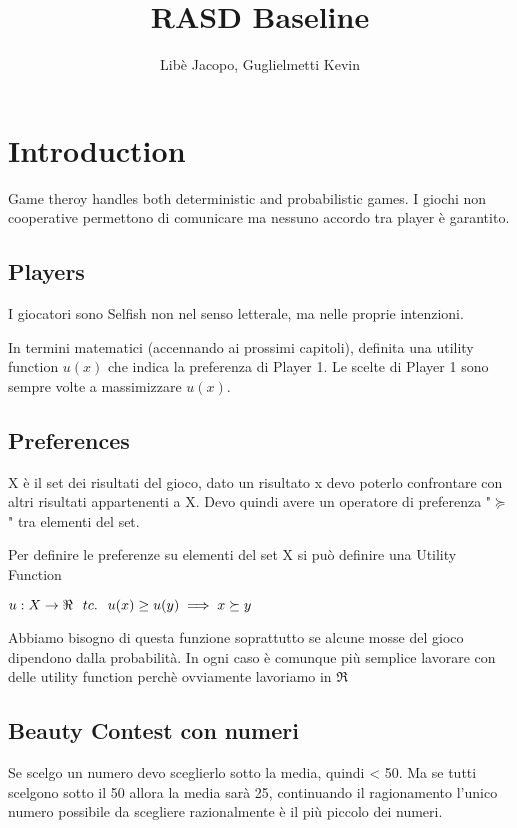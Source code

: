 \documentclass[10pt,a4paper]{report}
\author{Libè Jacopo, Guglielmetti Kevin}
\title{RASD Baseline}
\begin{document}
    
    \tableofcontents

    \chapter{Introduction}
        \newpage
        
        
        Game theroy handles both deterministic and probabilistic games.
        I giochi non cooperative permettono di comunicare ma nessuno accordo tra player è garantito.
        \section{Players}
        I giocatori sono Selfish non nel senso letterale, ma nelle proprie intenzioni.

        In termini matematici (accennando ai prossimi capitoli), definita una utility function $u(x)$ che indica la preferenza di Player 1.
        Le scelte di Player 1 sono sempre volte a massimizzare $u(x)$.

        \section{Preferences}
        X è il set dei risultati del gioco, dato un risultato x devo poterlo confrontare con altri risultati appartenenti a X. Devo quindi avere un operatore di preferenza "$\succeq$" tra elementi del set.

        Per definire le preferenze su elementi del set X si può definire una Utility Function
        
        $u: X \to \Re \hspace{.25cm} tc. \hspace{.25cm} u(x) \ge u(y) \implies x \succeq y$

        Abbiamo bisogno di questa funzione soprattutto se alcune mosse del gioco dipendono dalla probabilità.
        In ogni caso è comunque più semplice lavorare con delle utility function perchè ovviamente lavoriamo in $\Re$

        \section{Beauty Contest con numeri}
        Se scelgo un numero devo sceglierlo sotto la media, quindi < 50.
        Ma se tutti scelgono sotto il 50 allora la media sarà 25, continuando il ragionamento l'unico numero possibile da scegliere razionalmente è il più piccolo dei numeri.
\end{document}
